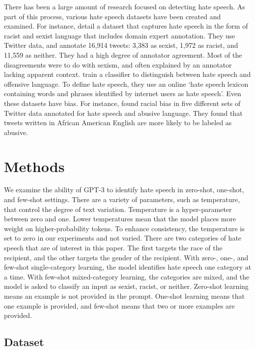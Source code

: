 \documentclass[12pt,]{article}
\begin{document}
There has been a large amount of research focused on detecting hate speech. As part of this process, various hate speech datasets have been created and examined. For instance, \citet{waseem2016hateful} detail a dataset that captures hate speech in the form of racist and sexist language that includes domain expert annotation. They use Twitter data, and annotate 16,914 tweets: 3,383 as sexist, 1,972 as racist, and 11,559 as neither. They had a high degree of annotator agreement. Most of the disagreements were to do with sexism, and often explained by an annotator lacking apparent context. \citet{davidson2017automated} train a classifier to distinguish between hate speech and offensive language. To define hate speech, they use an online `hate speech lexicon containing words and phrases identified by internet users as hate speech'. Even these datasets have bias. For instance, \citet{davidson2019racial} found racial bias in five different sets of Twitter data annotated for hate speech and abusive language. They found that tweets written in African American English are more likely to be labeled as abusive.

\hypertarget{methods}{%
\section{Methods}\label{methods}}

We examine the ability of GPT-3 to identify hate speech in zero-shot, one-shot, and few-shot settings. There are a variety of parameters, such as temperature, that control the degree of text variation. Temperature is a hyper-parameter between zero and one. Lower temperatures mean that the model places more weight on higher-probability tokens. To enhance consistency, the temperature is set to zero in our experiments and not varied. There are two categories of hate speech that are of interest in this paper. The first targets the race of the recipient, and the other targets the gender of the recipient. With zero-, one-, and few-shot single-category learning, the model identifies hate speech one category at a time. With few-shot mixed-category learning, the categories are mixed, and the model is asked to classify an input as sexist, racist, or neither. Zero-shot learning means an example is not provided in the prompt. One-shot learning means that one example is provided, and few-shot means that two or more examples are provided.

\hypertarget{dataset}{%
\subsection{Dataset}\label{dataset}}
\end{document}
